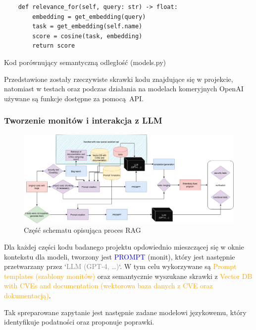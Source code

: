 \begin{listing}
    \begin{verbatim}  
    def relevance_for(self, query: str) -> float:
        embedding = get_embedding(query)
        task = get_embedding(self.name)
        score = cosine(task, embedding)
        return score
    \end{verbatim}
    \caption{Kod porównujący semantyczną odległość (models.py)} 
    \label{listing:vector_relevance}
\end{listing}
    
Przedstawione zostały rzeczywiste skrawki kodu znajdujące się w projekcie, natomiast w testach oraz podczas działania na modelach komeryjnych OpenAI używane są funkcje dostępne za pomocą API.


\subsubsection{Tworzenie monitów i interakcja z LLM}
\begin{figure}[h]
    \centering
    \includegraphics[clip, trim=3cm 10cm 3cm 0cm, width=0.9\linewidth]{img/gptester.drawio.png}
    \caption{Część schematu opisująca proces RAG}
    \label{fig:przyciety_obraz}
\end{figure}
Dla każdej części kodu badanego projektu opdowiednio mieszczącej się w oknie kontekstu dla modeli, tworzony jest \textcolor{blue}{PROMPT} (monit), który jest następnie przetwarzany przez `\textcolor{gray}{LLM (GPT-4, \ldots)}`. 
W tym celu wykorzywane są \textcolor{orange}{Prompt templates (szablony monitów)} oraz semantycznie wyszukane skrawki z \textcolor{orange}{Vector DB with CVEs and documentation (wektorowa baza danych z CVE oraz dokumentacją)}.

Tak spreparowane zapytanie jest następnie zadane modelowi językowemu, który identyfikuje podatności oraz proponuje poprawki.

